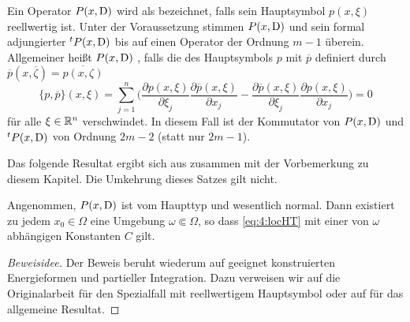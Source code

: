 Ein Operator $P(x,\mathrm D)$ wird als   bezeichnet, falls sein Hauptsymbol $p(x,\xi)$ reellwertig ist. Unter der Voraussetzung stimmen $P(x,\mathrm D)$ und sein formal adjungierter ${}^tP(x,\mathrm D)$ bis auf einen Operator der Ordnung $m-1$ überein. Allgemeiner heißt $P(x,\mathrm D)$ , falls die   des Hauptsymbols $p$ mit $\overline p$ definiert durch $\overline p(x, \overline\zeta) = \overline{p(x,\zeta)}$
\begin{equation}
    \{ p,\overline p\} (x,\xi) = \sum_{j=1}^n \bigg(\frac{\partial p(x,\xi)}{\partial \xi_j} \frac{\partial \overline p (x,\xi)}{\partial x_j} - \frac{\partial \overline p(x,\xi)}{\partial \xi_j}\frac{\partial  p(x,\xi)}{\partial x_j} \bigg)    = 0 
\end{equation}
für alle $\xi\in\mathbb R^n$ verschwindet. In diesem Fall ist der Kommutator von $P(x,\mathrm D)$ und ${}^tP(x,\mathrm D)$ von Ordnung $2m-2$ (statt nur $2m-1$).

Das folgende Resultat ergibt sich aus \cite[Theorem~4.1]{Hormander:1955} zusammen mit der Vorbemerkung zu diesem Kapitel. Die Umkehrung dieses Satzes gilt nicht.

\begin{thm}\label{thm:4:4.2}
Angenommen, $P(x,\mathrm D)$ ist vom Haupttyp und wesentlich normal. Dann existiert zu jedem $x_0\in\Omega$ eine Umgebung $\omega\Subset\Omega$, so dass
\eqref{eq:4:locHT} mit einer von $\omega$ abhängigen Konstanten $C$ gilt.
\end{thm}
\begin{proof}[Beweisidee]
Der Beweis beruht wiederum auf geeignet konstruierten Energieformen und partieller Integration. Dazu verweisen wir auf die Originalarbeit \cite[Section 4.2]{Hormander:1955} für den Spezialfall mit reellwertigem Hauptsymbol oder auf \cite[Section 8.5]{Hormander:1963} für das allgemeine Resultat.
\end{proof}


